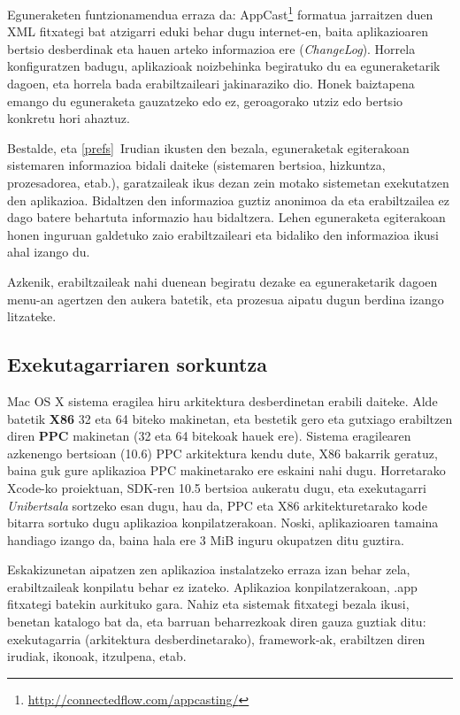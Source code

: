 Eguneraketen funtzionamendua erraza da: AppCast\footnote{\url{http://connectedflow.com/appcasting/}} formatua jarraitzen duen XML fitxategi bat atzigarri eduki behar dugu internet-en, baita aplikazioaren bertsio desberdinak eta hauen arteko informazioa ere (\textit{ChangeLog}). Horrela konfiguratzen badugu, aplikazioak noizbehinka begiratuko du ea eguneraketarik dagoen, eta horrela bada erabiltzaileari jakinaraziko dio. Honek baiztapena emango du eguneraketa gauzatzeko edo ez, geroagorako utziz edo bertsio konkretu hori ahaztuz.

Bestalde, eta \ref{prefs}~Irudian ikusten den bezala, eguneraketak egiterakoan sistemaren informazioa bidali daiteke (sistemaren bertsioa, hizkuntza, prozesadorea, etab.), garatzaileak ikus dezan zein motako sistemetan exekutatzen den aplikazioa. Bidaltzen den informazioa guztiz anonimoa da eta erabiltzailea ez dago batere behartuta informazio hau bidaltzera. Lehen eguneraketa egiterakoan honen inguruan galdetuko zaio erabiltzaileari eta bidaliko den informazioa ikusi ahal izango du.

Azkenik, erabiltzaileak nahi duenean begiratu dezake ea eguneraketarik dagoen menu-an agertzen den aukera batetik, eta prozesua aipatu dugun berdina izango litzateke.

\subsection{Exekutagarriaren sorkuntza}
Mac OS X sistema eragilea hiru arkitektura desberdinetan erabili daiteke. Alde batetik \textbf{X86} 32 eta 64 biteko makinetan, eta bestetik gero eta gutxiago erabiltzen diren \textbf{PPC} makinetan (32 eta 64 bitekoak hauek ere). Sistema eragilearen azkenengo bertsioan (10.6) PPC arkitektura kendu dute, X86 bakarrik geratuz, baina guk gure aplikazioa PPC makinetarako ere eskaini nahi dugu. Horretarako Xcode-ko proiektuan, SDK-ren 10.5 bertsioa aukeratu dugu, eta exekutagarri \textit{Unibertsala} sortzeko esan dugu, hau da, PPC eta X86 arkitekturetarako kode bitarra sortuko dugu aplikazioa konpilatzerakoan. Noski, aplikazioaren tamaina handiago izango da, baina hala ere 3 MiB inguru okupatzen ditu guztira.

Eskakizunetan aipatzen zen aplikazioa instalatzeko erraza izan behar zela, erabiltzaileak konpilatu behar ez izateko. Aplikazioa konpilatzerakoan, .app fitxategi batekin aurkituko gara. Nahiz eta sistemak fitxategi bezala ikusi, benetan katalogo bat da, eta barruan beharrezkoak diren gauza guztiak ditu: exekutagarria (arkitektura desberdinetarako), framework-ak, erabiltzen diren irudiak, ikonoak, itzulpena, etab.


